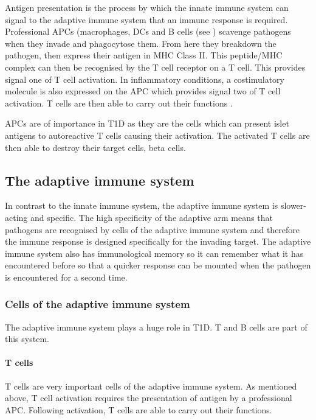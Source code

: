 Antigen presentation is the process by which the innate immune system can signal to the adaptive immune system that an immune response is required.
Professional APCs (macrophages, DCs and B cells (see ) scavenge pathogens when they invade and phagocytose them.
From here they breakdown the pathogen, then express their antigen in MHC Class II.
This peptide/MHC complex can then be recognised by the T cell receptor on a T cell.
This provides signal one of T cell activation.
In inflammatory conditions, a costimulatory molecule is also expressed on the APC which provides signal two of T cell activation.
T cells are then able to carry out their functions .

APCs are of importance in T1D as they are the cells which can present islet antigens to autoreactive T cells causing their activation.
The activated T cells are then able to destroy their target cells, beta cells.


\subsection{The adaptive immune system}

In contrast to the innate immune system, the adaptive immune system is slower-acting and specific.
The high specificity of the adaptive arm means that pathogens are recognised by cells of the adaptive immune system and therefore the immune response is designed specifically for the invading target.
The adaptive immune system also has immunological memory so it can remember what it has encountered before so that a quicker response can be mounted when the pathogen is encountered for a second time.

\subsubsection{Cells of the adaptive immune system}
The adaptive immune system plays a huge role in T1D.
T and B cells are part of this system.

\paragraph{T cells}
T cells are very important cells of the adaptive immune system.
As mentioned above, T cell activation requires the presentation of antigen by a professional APC.
Following activation, T cells are able to carry out their functions.

